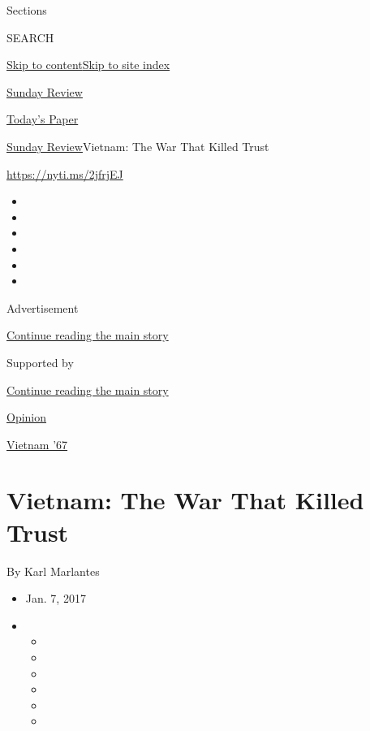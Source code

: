 Sections

SEARCH

\protect\hyperlink{site-content}{Skip to
content}\protect\hyperlink{site-index}{Skip to site index}

\href{https://www.nytimes.com/section/opinion/sunday}{Sunday Review}

\href{https://myaccount.nytimes.com/auth/login?response_type=cookie\&client_id=vi}{}

\href{https://www.nytimes.com/section/todayspaper}{Today's Paper}

\href{/section/opinion/sunday}{Sunday Review}\textbar{}Vietnam: The War
That Killed Trust

\href{https://nyti.ms/2jfrjEJ}{https://nyti.ms/2jfrjEJ}

\begin{itemize}
\item
\item
\item
\item
\item
\item
\end{itemize}

Advertisement

\protect\hyperlink{after-top}{Continue reading the main story}

Supported by

\protect\hyperlink{after-sponsor}{Continue reading the main story}

\href{/section/opinion}{Opinion}

\href{/column/vietnam-67}{Vietnam '67}

\hypertarget{vietnam-the-war-that-killed-trust}{%
\section{Vietnam: The War That Killed
Trust}\label{vietnam-the-war-that-killed-trust}}

By Karl Marlantes

\begin{itemize}
\item
  Jan. 7, 2017
\item
  \begin{itemize}
  \item
  \item
  \item
  \item
  \item
  \item
  \end{itemize}
\end{itemize}

